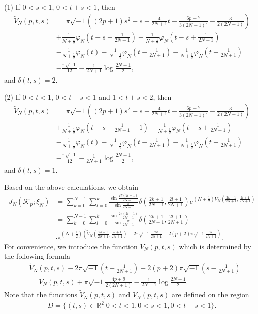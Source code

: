 \documentclass[12pt]{amsart}
\begin{document}
(1) If $0<s<1$, $0<t\pm s<1$, then 
\begin{align*}
    \tilde{V}_N(p,t,s)&=\pi \sqrt{-1}\left((2p+1)s^2+s+\frac{4}{2N+1}t-\frac{6p+7}{3(2N+1)^2}-\frac{3}{2(2N+1)}\right)\\\nonumber
    &+\frac{1}{N+\frac{1}{2}}\varphi_N\left(t+s+\frac{1}{2N+1}\right)+\frac{1}{N+\frac{1}{2}}\varphi_N\left(t-s+\frac{1}{2N+1}\right)\\\nonumber
    &-\frac{1}{N+\frac{1}{2}}\varphi_N\left(t\right)-\frac{1}{N+\frac{1}{2}}\varphi_N\left(t-\frac{1}{2N+1}\right)-\frac{1}{N+\frac{1}{2}}\varphi_N\left(t+\frac{1}{2N+1}\right)\\\nonumber
    &-\frac{\pi\sqrt{-1}}{12 }-\frac{1}{2N+1}\log \frac{2N+1}{2},
\end{align*}
and $\delta(t,s)=2$. 

(2) If $0<t<1$, $0<t-s<1$ and $1<t+s<2$,  then 
\begin{align*}
    \tilde{V}_N(p,t,s)&=\pi \sqrt{-1}\left((2p+1)s^2+s+\frac{4}{2N+1}t-\frac{6p+7}{3(2N+1)^2}-\frac{3}{2(2N+1)}\right)\\\nonumber
    &+\frac{1}{N+\frac{1}{2}}\varphi_N\left(t+s+\frac{1}{2N+1}-1\right)+\frac{1}{N+\frac{1}{2}}\varphi_N\left(t-s+\frac{1}{2N+1}\right)\\\nonumber
    &-\frac{1}{N+\frac{1}{2}}\varphi_N\left(t\right)-\frac{1}{N+\frac{1}{2}}\varphi_N\left(t-\frac{1}{2N+1}\right)-\frac{1}{N+\frac{1}{2}}\varphi_N\left(t+\frac{1}{2N+1}\right)\\\nonumber
    &-\frac{\pi\sqrt{-1}}{12 }-\frac{1}{2N+1}\log \frac{2N+1}{2},
\end{align*}
and $\delta(t,s)=1$. 

Based on the above calculations, we obtain
\begin{align} \label{formula-coloredJonesPotential1}
    J_{N}(\mathcal{K}_p;\xi_N)&=\sum_{k=0}^{N-1}\sum_{l=0}^k\frac{\sin \frac{2\pi (2l+1)}{2N+1}}{\sin\frac{\pi}{2N+1}}\delta\left(\frac{2k+1}{2N+1},\frac{2l+1}{2N+1}\right)e^{(N+\frac{1}{2})\tilde{V}_N\left(\frac{2k+1}{2N+1},\frac{2l+1}{2N+1}\right)}\\\nonumber
    &=\sum_{k=0}^{N-1}\sum_{l=0}^k\frac{\sin \frac{2\pi (2l+1)}{2N+1}}{\sin\frac{\pi}{2N+1}}\delta\left(\frac{2k+1}{2N+1},\frac{2l+1}{2N+1}\right)\\\nonumber
    &\cdot e^{(N+\frac{1}{2})\left(\tilde{V}_N\left(\frac{2k+1}{2N+1},\frac{2l+1}{2N+1}\right)-2\pi\sqrt{-1}\frac{2k}{2N+1}-2(p+2)\pi\sqrt{-1}\frac{2l}{2N+1}\right)}. 
\end{align}
For convenience, we introduce the function $V_N(p,t,s)$ which is determined by the following formula  
\begin{align}
    &\tilde{V}_N(p,t,s)-2\pi\sqrt{-1}(t-\frac{1}{2N+1})-2(p+2)\pi\sqrt{-1}(s-\frac{1}{2N+1})\\\nonumber
    &=V_N(p,t,s)+\pi\sqrt{-1}\frac{4p+9}{2(2N+1)}-\frac{1}{2N+1}\log \frac{2N+1}{2}. 
\end{align}
Note that the functions $\tilde{V}_N(p,t,s)$ and $V_N(p,t,s)$ are defined on the region 
    \begin{align}
    D=\{(t,s)\in \mathbb{R}^2| 0<t<1, 0<s<1,  0< t-s<1\}.
\end{align}
\end{document}
